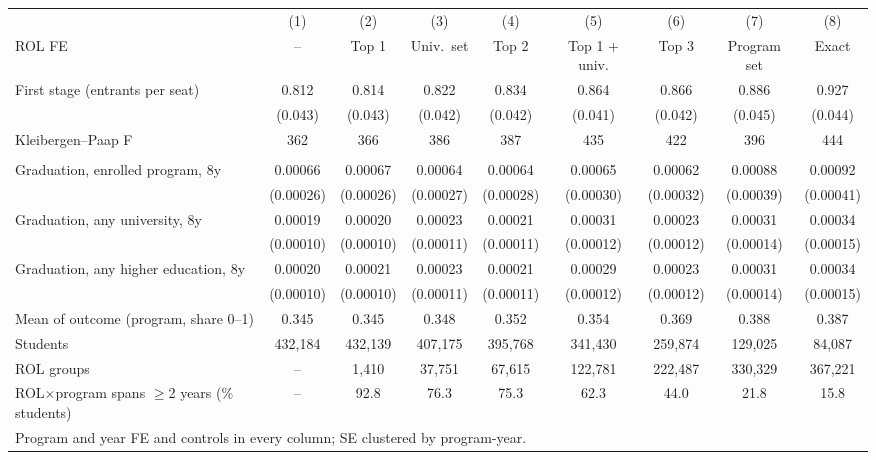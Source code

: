 \begin{tabular}{l*{8}{c}}
\toprule
  & (1) & (2) & (3) & (4) & (5) & (6) & (7) & (8) \\
ROL FE & -- & Top 1 & Univ.\ set & Top 2 & Top 1 + univ. & Top 3 & Program set & Exact \\
\midrule
First stage (entrants per seat) &  0.812\sym{***} &  0.814\sym{***} &  0.822\sym{***} &  0.834\sym{***} &  0.864\sym{***} &  0.866\sym{***} &  0.886\sym{***} &  0.927\sym{***} \\
 & (0.043) & (0.043) & (0.042) & (0.042) & (0.041) & (0.042) & (0.045) & (0.044) \\
Kleibergen--Paap F &    362 &    366 &    386 &    387 &    435 &    422 &    396 &    444 \\
\addlinespace
\multicolumn{9}{l}{2SLS: effect of one more entrant (probability; 0.001 = 0.1 pp)} \\
\quad Graduation, enrolled program, 8y &  0.00066\sym{**} &  0.00067\sym{**} &  0.00064\sym{**} &  0.00064\sym{**} &  0.00065\sym{**} &  0.00062\sym{*} &  0.00088\sym{**} &  0.00092\sym{**} \\
 & (0.00026) & (0.00026) & (0.00027) & (0.00028) & (0.00030) & (0.00032) & (0.00039) & (0.00041) \\
\quad Graduation, any university, 8y &  0.00019\sym{*} &  0.00020\sym{**} &  0.00023\sym{**} &  0.00021\sym{*} &  0.00031\sym{**} &  0.00023\sym{*} &  0.00031\sym{**} &  0.00034\sym{**} \\
 & (0.00010) & (0.00010) & (0.00011) & (0.00011) & (0.00012) & (0.00012) & (0.00014) & (0.00015) \\
\quad Graduation, any higher education, 8y &  0.00020\sym{**} &  0.00021\sym{**} &  0.00023\sym{**} &  0.00021\sym{*} &  0.00029\sym{**} &  0.00023\sym{*} &  0.00031\sym{**} &  0.00034\sym{**} \\
 & (0.00010) & (0.00010) & (0.00011) & (0.00011) & (0.00012) & (0.00012) & (0.00014) & (0.00015) \\
\addlinespace
Mean of outcome (program, share 0--1) & 0.345 & 0.345 & 0.348 & 0.352 & 0.354 & 0.369 & 0.388 & 0.387 \\
Students &   432,184 &   432,139 &   407,175 &   395,768 &   341,430 &   259,874 &   129,025 &    84,087 \\
ROL groups & -- &     1,410 &    37,751 &    67,615 &   122,781 &   222,487 &   330,329 &   367,221 \\
ROL\(\times\)program spans \(\geq\)2 years (\% students) & -- &  92.8 &  76.3 &  75.3 &  62.3 &  44.0 &  21.8 &  15.8 \\
\midrule
\multicolumn{9}{l}{Program and year FE and controls in every column; SE clustered by program-year.} \\
\bottomrule
\end{tabular}
